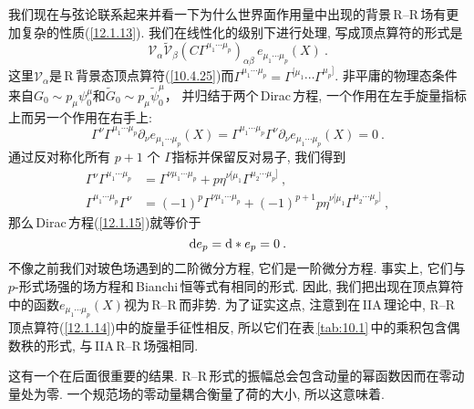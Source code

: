 我们现在与弦论联系起来并看一下为什么世界面作用量中出现的背景\,R--R\,场有更加复杂的性质(\ref{12.1.13}). 我们在线性化的级别下进行处理, 写成顶点算符的形式是
\begin{equation}
    \mathscr{V}_{\alpha}\tilde{\mathscr{V}}_{\beta}(C\Gamma^{\mu_{1}\cdots\mu_{p}})_{\alpha\beta}\,e_{\mu_{1}\cdots\mu_{p}}(X) \:. \label{12.1.14}
\end{equation}
这里$ \mathscr{V}_{\alpha} $是\,R\,背景态顶点算符(\ref{10.4.25})而$ \Gamma^{\mu_{1}\cdots\mu_{p}}=\Gamma^{[\mu_{1}}\cdots\Gamma^{\mu_{p}]}$. 非平庸的物理态条件来自$ G_{0}\sim p_{\mu}\psi_{0}^{\mu} $和$ \tilde{G}_{0}\sim p_{\mu}\tilde{\psi}_{0}^{\mu}$， 并归结于两个\,Dirac\,方程, 一个作用在左手旋量指标上而另一个作用在右手上:
\begin{equation}
    \Gamma^{\nu}\Gamma^{\mu_{1}\cdots\mu_{p}}\partial_{\nu}e_{\mu_{1}\cdots \mu_{p}}(X)=
    \Gamma^{\mu_{1}\cdots\mu_{p}}\Gamma^{\nu}\partial_{\nu}e_{\mu_{1}\cdots \mu_{p}}(X)=0\:.\label{12.1.15}
\end{equation}
通过反对称化所有 $p+1$ 个 $\Gamma $指标并保留反对易子, 我们得到
\begin{subequations} \label{12.1.16} %
    \begin{align}
        \Gamma^{\nu}\Gamma^{\mu_{1}\cdots\mu_{p}}&=\Gamma^{\nu\mu_{1}\cdots\mu_{p}}+p\eta^{\nu[\mu_{1}}\Gamma^{\mu_{2}\cdots\mu_{p}]}\:, \label{12.1.16a} \\  
        \Gamma^{\mu_{1}\cdots\mu_{p}}\Gamma^{\nu}&=(-1)^{p}\Gamma^{\nu\mu_{1}\cdots\mu_{p}}+(-1)^{p+1}p\eta^{\nu[\mu_{1}}\Gamma^{\mu_{2}\cdots\mu_{p}]}\:, \label{12.1.16b} 
    \end{align} 
\end{subequations}
那么\,Dirac\,方程(\ref{12.1.15})就等价于
\begin{equation}
    \mathrm{d} e_{p} = \mathrm{d}\ast e_{p}=0 \:. \label{12.1.17}
\end{equation}
不像之前我们对玻色场遇到的二阶微分方程, 它们是一阶微分方程. 事实上, 它们与$ p $-形式场强的场方程和\,Bianchi\,恒等式有相同的形式. 因此, 我们把出现在顶点算符中的函数$ e_{\mu_{1}\cdots \mu_{p}}(X) $视为\,R--R\,{}而非势. 为了证实这点, 注意到在\,IIA\,理论中, R--R\,顶点算符(\ref{12.1.14})中的旋量手征性相反, 所以它们在表\,\ref{tab:10.1}\,中的乘积包含偶数秩的形式, 与\,IIA\,R--R\,场强相同.

这有一个在后面很重要的结果. R--R\,形式的振幅总会包含动量的幂函数因而在零动量处为零. 一个规范场的零动量耦合衡量了荷的大小, 所以这意味着{}.

